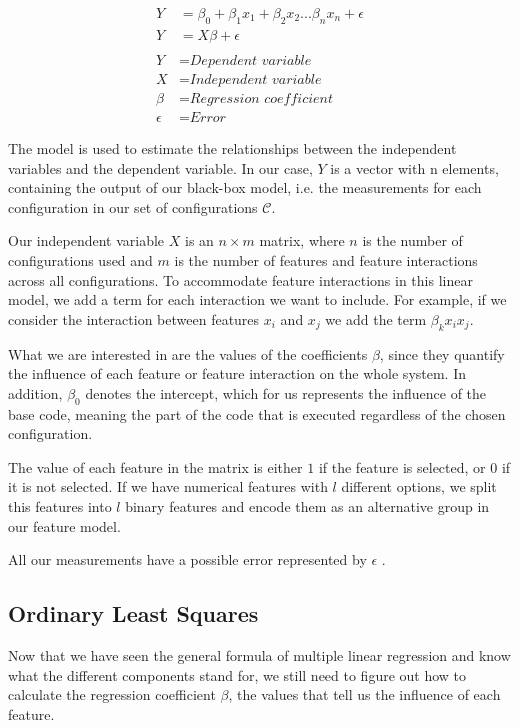 \begin{align}\label{formula:linReg}
    Y &= \beta_0 + \beta_1 x_1 + \beta_2 x_2 ... \beta_n x_n + \epsilon   \\
    Y &= X \beta + \epsilon \nonumber\\ \nonumber \\ \nonumber
    Y &= \textit{Dependent variable}\\ \nonumber
    X &= \textit{Independent variable}\\ \nonumber
    \beta &= \textit{Regression coefficient}\\ \nonumber
    \epsilon &= \textit{Error} \nonumber
\end{align}

The model is used to estimate the relationships between the independent variables and the dependent variable.
In our case, $Y$ is a vector with n elements, containing the output of our black-box model, 
i.e. the measurements for each configuration in our set of configurations $\mathcal{C}$. 

Our independent variable $X$ is an $n \times m$ matrix, where $n$ is the number of configurations used and $m$ is the number of features and feature
interactions across all configurations.
To accommodate feature interactions in this linear model, we add a term for each interaction we want to include. For example,
if we consider the interaction between features $x_i$ and $x_j$ we add the term $\beta_k x_i x_j$. 

What we are interested in are the values of the coefficients $\beta$, since they quantify the influence of each feature or feature interaction
on the whole system. In addition, $\beta_0$ denotes the intercept, which for us represents the influence of the base code, meaning
the part of the code that is executed regardless of the chosen configuration.

The value of each feature in the matrix is either $1$ if the feature is selected, or $0$ if it is not selected. 
If we have numerical features with $l$ different options,
we split this features into $l$ binary features and encode them as an alternative group in our feature model.

All our measurements have a possible error represented by $\epsilon$ \cite{Linear-Regression}.

\subsection{Ordinary Least Squares}
Now that we have seen the general formula of multiple linear regression and know what the different components stand for, we still need to figure out 
how to calculate the regression coefficient $\beta$, the values that tell us the influence of each feature. 

